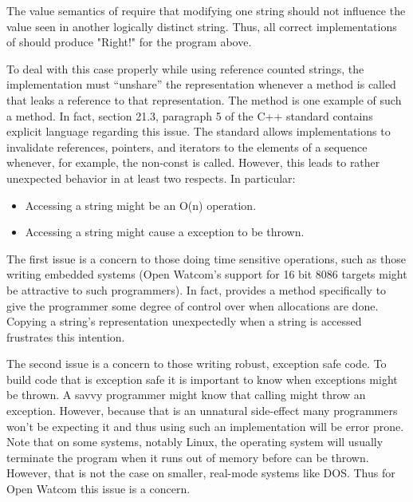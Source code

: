 The value semantics of  require that modifying one string
should not influence the value seen in another logically distinct string.
Thus, all correct implementations of  should produce
"Right!" for the program above.

To deal with this case properly while using reference counted strings, the
implementation must ``unshare'' the representation whenever a method is called
that leaks a reference to that representation. The method  is
one example of such a method. In fact, section 21.3, paragraph 5 of the C++
standard contains explicit language regarding this issue. The standard allows
implementations to invalidate references, pointers, and iterators to the
elements of a  sequence whenever, for example, the
non-const  is called. However, this leads to rather
unexpected behavior in at least two respects. In particular:

\begin{itemize}
\item Accessing a string might be an O(n) operation.
\item Accessing a string might cause a  exception to be
thrown.
\end{itemize}

The first issue is a concern to those doing time sensitive operations, such as
those writing embedded systems (Open Watcom's support for 16 bit 8086 targets
might be attractive to such programmers). In fact,  provides
a  method specifically to give the programmer some degree of
control over when allocations are done. Copying a string's representation
unexpectedly when a string is accessed frustrates this intention.

The second issue is a concern to those writing robust, exception safe code. To
build code that is exception safe it is important to know when exceptions
might be thrown. A savvy programmer might know that calling
 might throw an exception. However, because that
is an unnatural side-effect many programmers won't be expecting it and thus
using such an implementation will be error prone. Note that on some systems,
notably Linux, the operating system will usually terminate the program when it
runs out of memory before  can be thrown. However, that
is not the case on smaller, real-mode systems like DOS. Thus for Open Watcom
this issue is a concern.

